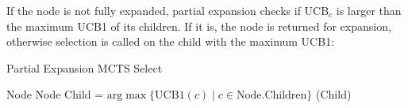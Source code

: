 If the node is not fully expanded, partial expansion checks if
$\text{UCB}_c$ is larger than the maximum UCB1 of its children.
If it is, the node is returned for expansion, otherwise selection 
is called on the child with the maximum UCB1:
\begin{algorithm}
    \caption{Partial Expansion MCTS Select}
    \begin{algorithmic}[1]
                \State \Return Node
            \EndIf
            \State \Return Node
            \Else
            \State Child = 
            $\text{arg}\max \{ \text{UCB1}(c) \;|\; c \in \text{Node.Children} \}$ 
            \State \Return {}(Child)

            \EndIf
        \EndProcedure
    \end{algorithmic}        
\end{algorithm}